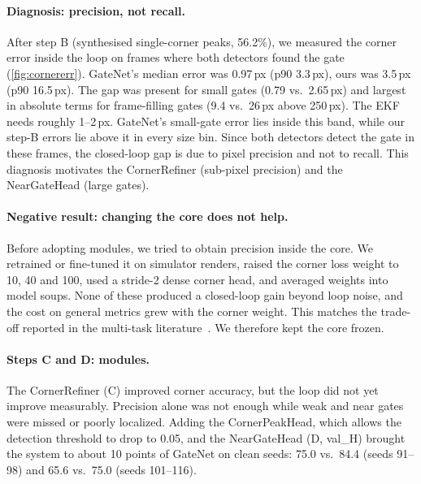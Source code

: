 \documentclass[10pt,twocolumn,letterpaper]{article}
\begin{document}
\paragraph{Diagnosis: precision, not recall.}
After step B (synthesised single-corner peaks, 56.2\%), we measured the corner error inside the loop on frames where both detectors found the gate (\cref{fig:cornererr}). GateNet's median error was 0.97\,px (p90 3.3\,px), ours was 3.5\,px (p90 16.5\,px). The gap was present for small gates (0.79 vs.\ 2.65\,px) and largest in absolute terms for frame-filling gates (9.4 vs.\ 26\,px above 250\,px). The EKF needs roughly 1--2\,px. GateNet's small-gate error lies inside this band, while our step-B errors lie above it in every size bin. Since both detectors detect the gate in these frames, the closed-loop gap is due to pixel precision and not to recall. This diagnosis motivates the CornerRefiner (sub-pixel precision) and the NearGateHead (large gates).

\paragraph{Negative result: changing the core does not help.}
Before adopting modules, we tried to obtain precision inside the core. We retrained or fine-tuned it on simulator renders, raised the corner loss weight to 10, 40 and 100, used a stride-2 dense corner head, and averaged weights into model soups. None of these produced a closed-loop gain beyond loop noise, and the cost on general metrics grew with the corner weight. This matches the trade-off reported in the multi-task literature~\cite{Xin2022DoCurrent}. We therefore kept the core frozen.

\paragraph{Steps C and D: modules.}
The CornerRefiner (C) improved corner accuracy, but the loop did not yet improve measurably. Precision alone was not enough while weak and near gates were missed or poorly localized. Adding the CornerPeakHead, which allows the detection threshold to drop to 0.05, and the NearGateHead (D, val\_H) brought the system to about 10 points of GateNet on clean seeds: 75.0 vs.\ 84.4 (seeds 91--98) and 65.6 vs.\ 75.0 (seeds 101--116).
\end{document}
